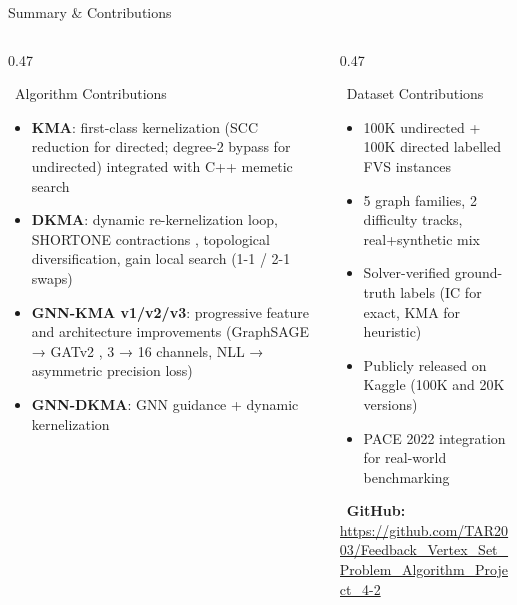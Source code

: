 \documentclass[aspectratio=169,10pt]{beamer}
\newcommand{\highlight}[1]{\textcolor{midblue}{\textbf{#1}}}
\renewcommand{\footnotesize}{\tiny}
\begin{document}
\begin{frame}{Summary \& Contributions}
  \begin{columns}[T]
    \begin{column}{0.47\textwidth}
      \begin{block}{\faCode~Algorithm Contributions}
        \begin{itemize}\setlength\itemsep{2pt}
          \item \highlight{KMA}: first-class kernelization (SCC reduction
            for directed; degree-2 bypass for undirected) integrated
            with C++ memetic search
          \item \highlight{DKMA}: dynamic re-kernelization loop,
            SHORTONE contractions \cite{langedal2022},
            topological diversification,
            gain local search (1-1 / 2-1 swaps)
          \item \highlight{GNN-KMA v1/v2/v3}: progressive feature and
            architecture improvements (GraphSAGE → GATv2 \cite{brody2022},
            3 → 16 channels, NLL → asymmetric precision loss)
          \item \highlight{GNN-DKMA}: GNN guidance + dynamic kernelization
        \end{itemize}
      \end{block}
    \end{column}
    \begin{column}{0.47\textwidth}
      \begin{block}{\faDatabase~Dataset Contributions}
        \begin{itemize}\setlength\itemsep{2pt}
          \item 100K undirected + 100K directed labelled FVS instances
          \item 5 graph families, 2 difficulty tracks, real+synthetic mix
          \item Solver-verified ground-truth labels (IC for exact,
            KMA for heuristic)
          \item Publicly released on Kaggle (100K and 20K versions)
          \item PACE 2022 integration for real-world benchmarking
        \end{itemize}
      \end{block}
      \vspace{4pt}
      \begin{tcolorbox}[greenbox,fontupper=\footnotesize]
        \faGithub~\textbf{GitHub:}\\
        {\tiny\url{https://github.com/TAR2003/Feedback_Vertex_Set_Problem_Algorithm_Project_4-2}}\\[4pt]

\end{tcolorbox}
\end{column}
\end{columns}
\end{frame}
\end{document}
